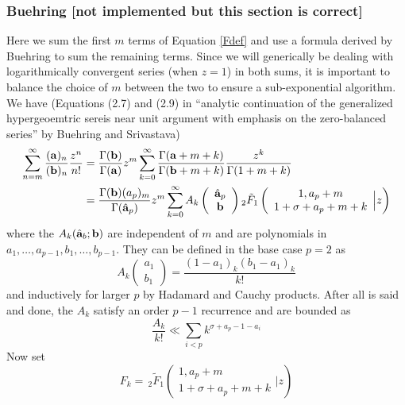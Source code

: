 \documentclass[10pt]{article}
\numberwithin{equation}{section}
\begin{document}
\subsubsection{Buehring [not implemented but this section is correct]}
Here we sum the first $m$ terms of Equation \eqref{Fdef} and use a formula derived by Buehring to sum the remaining terms. Since we will generically be dealing with logarithmically convergent series (when $z=1$) in both sums, it is important to balance the choice of $m$ between the two to ensure a sub-exponential algorithm.
We have (Equations (2.7) and (2.9) in ``analytic continuation of the generalized hypergeoemtric sereis near unit argument with emphasis on the zero-balanced series'' by Buehring and Srivastava)
\begin{align}
\nonumber
\sum_{n=m}^{\infty}{\frac{(\bold{a})_n}{(\bold{b})_n} \frac{z^n}{n!}}&=\frac{\Gamma(\bold{b})}{\Gamma(\bold{a})} z^m \sum_{k=0}^{\infty} {\frac{\Gamma(\bold{a}+m+k)}{\Gamma(\bold{b}+m+k)} \frac{z^k}{\Gamma(1+m+k)}}\\
\label{buehring}
&=\frac{\Gamma(\bold{b})(a_p)_m}{\Gamma(\hat{\bold{a}}_p)} z^m \sum_{k=0}^{\infty} {A_k\left(\begin{array}{c} \hat{\bold{a}}_p \\ \bold{b} \end{array}\right)} \,{} _2\tilde{F}_1\left( \begin{array}{c} 1,a_p+m \\ 1+\sigma+a_p+m+k \end{array} \Big| z\right)
\end{align}
where the $A_k(\hat{\bold{a}}_b; \bold{b})$ are independent of $m$ and are polynomials in $a_1,\dots,a_{p-1},b_1,\dots,b_{p-1}$. They can be defined in the base case $p=2$ as
\begin{equation*}
A_k\left(\begin{array}{c} a_1 \\ b_1 \end{array}\right) = \frac{(1-a_1)_k(b_1-a_1)_k}{k!}
\end{equation*}
and inductively for larger $p$ by Hadamard and Cauchy products. After all is said and done, the $A_k$ satisfy an order $p-1$ recurrence and are bounded as
\begin{equation}
\frac{A_k}{k!} \ll \sum_{i<p}k^{\sigma+a_p-1-a_i}
\end{equation}
Now set
\begin{equation*}
F_k = \, _2\tilde{F}_1\left( \begin{array}{c} 1,a_p+m \\ 1+\sigma+a_p+m+k \end{array} \Big| z\right)
\end{equation*}
\end{document}

